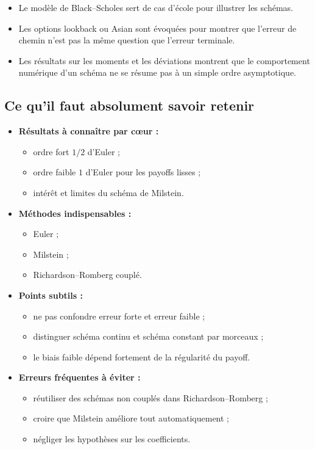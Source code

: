 \documentclass[11pt,a4paper]{article}
\begin{document}
\begin{itemize}
  \item Le modèle de Black--Scholes sert de cas d'école pour illustrer les schémas.
  \item Les options lookback ou Asian sont évoquées pour montrer que l'erreur de chemin n'est pas la même question que l'erreur terminale.
  \item Les résultats sur les moments et les déviations montrent que le comportement numérique d'un schéma ne se résume pas à un simple ordre asymptotique.
\end{itemize}

\subsection{Ce qu'il faut absolument savoir retenir}

\begin{itemize}
  \item \textbf{Résultats à connaître par cœur :}
  \begin{itemize}
    \item ordre fort $1/2$ d'Euler ;
    \item ordre faible $1$ d'Euler pour les payoffs lisses ;
    \item intérêt et limites du schéma de Milstein.
  \end{itemize}
  \item \textbf{Méthodes indispensables :}
  \begin{itemize}
    \item Euler ;
    \item Milstein ;
    \item Richardson--Romberg couplé.
  \end{itemize}
  \item \textbf{Points subtils :}
  \begin{itemize}
    \item ne pas confondre erreur forte et erreur faible ;
    \item distinguer schéma continu et schéma constant par morceaux ;
    \item le biais faible dépend fortement de la régularité du payoff.
  \end{itemize}
  \item \textbf{Erreurs fréquentes à éviter :}
  \begin{itemize}
    \item réutiliser des schémas non couplés dans Richardson--Romberg ;
    \item croire que Milstein améliore tout automatiquement ;
    \item négliger les hypothèses sur les coefficients.
  \end{itemize}
\end{itemize}
\end{document}

